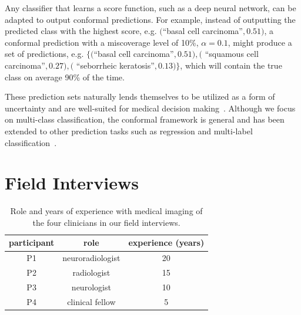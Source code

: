 \documentclass[letterpaper]{article} %
\begin{document}
        
        Any classifier that learns a score function, such as a deep neural network, can be adapted to output conformal predictions.
        For example, instead of outputting the predicted class with the highest score, e.g. $($``basal cell carcinoma''$, 0.51)$, a conformal prediction with a miscoverage level of 10\%, $\alpha=0.1$, might produce a set of predictions, e.g. $\{($``basal cell carcinoma''$, 0.51), ($ ``squamous cell carcinoma''$, 0.27), ($ ``seborrheic keratosis''$, 0.13)\}$, which will contain the true class on average 90\% of the time.
        
        These prediction sets naturally lends themselves to be utilized as a form of uncertainty and are well-suited for medical decision making~\cite{kompa,10.1007/s41666-021-00113-8}.
        Although we focus on multi-class classification, the conformal framework is general and has been extended to other prediction tasks such as regression and multi-label classification~\cite{NEURIPS2019_5103c358,JMLR:v22:20-753}. 
        
       
\section{Field Interviews}
    \begin{table}[t]
    \small
    \centering
    \begin{tabular}{ccc}
        \toprule
        \textbf{participant} & \textbf{role} & \textbf{experience (years)} \\
        \midrule
        P1 & neuroradiologist & 20 \\
        P2 & radiologist & 15 \\
        P3 & neurologist & 10 \\
        P4 & clinical fellow & 5 \\
        \bottomrule
    \end{tabular}
    \caption{Role and years of experience with medical imaging of the four clinicians in our field interviews.}
    \label{tab:field}
    \end{table}
    
\end{document}
